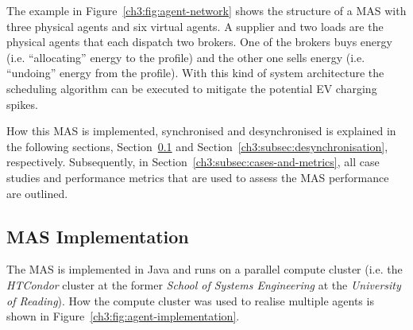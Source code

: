 

The example in Figure~\ref{ch3:fig:agent-network} shows the structure of a MAS with three physical agents and six virtual agents.
A supplier and two loads are the physical agents that each dispatch two brokers.
One of the brokers buys energy (i.e. ``allocating'' energy to the profile) and the other one sells energy (i.e. ``undoing'' energy from the profile).
With this kind of system architecture the scheduling algorithm can be executed to mitigate the potential EV charging spikes.

How this MAS is implemented, synchronised and desynchronised is explained in the following sections, Section~\ref{ch3:subsec:implementation} and Section~\ref{ch3:subsec:desynchronisation}, respectively.
Subsequently, in Section~\ref{ch3:subsec:cases-and-metrics}, all case studies and performance metrics that are used to assess the MAS performance are outlined.

\subsection{MAS Implementation}
\label{ch3:subsec:implementation}

The MAS is implemented in Java and runs on a parallel compute cluster (i.e. the \textit{HTCondor} cluster at the former \textit{School of Systems Engineering} at the \textit{University of Reading}).
How the compute cluster was used to realise multiple agents is shown in Figure~\ref{ch3:fig:agent-implementation}.



